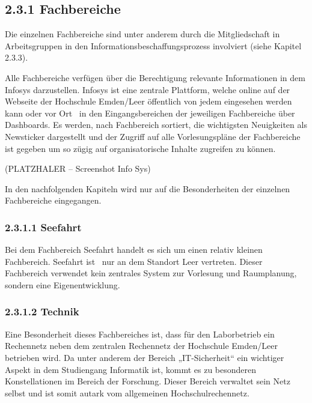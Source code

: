 \documentclass[a4paper]{article}
\begin{document}
\subsection[]{}
\subsection[2.3.1 Fachbereiche]{\bfseries 2.3.1 Fachbereiche}
{\sffamily\mdseries\color{black}
Die einzelnen Fachbereiche sind unter anderem durch die Mitgliedschaft in Arbeitsgruppen in den
Informationsbeschaffungsprozess involviert (siehe Kapitel 2.3.3). }


\bigskip

{\sffamily\mdseries\color{black}
Alle Fachbereiche verfügen über die Berechtigung relevante Informationen in dem Infosys darzustellen. Infosys ist eine
zentrale Plattform, welche online auf der Webseite der Hochschule Emden/Leer öffentlich von jedem eingesehen werden
kann oder vor Ort \ in den Eingangsbereichen der jeweiligen Fachbereiche über Dashboards. Es werden, nach Fachbereich
sortiert, die wichtigsten Neuigkeiten als Newsticker dargestellt und der Zugriff auf alle Vorlesungspläne der
Fachbereiche ist gegeben um so zügig auf organisatorische Inhalte zugreifen zu können. }


\bigskip

{\centering\sffamily\color[rgb]{0.77254903,0.0,0.043137256}
(PLATZHALER – Screenshot Info Sys)
\par}


\bigskip

{\sffamily\mdseries\color{black}
In den nachfolgenden Kapiteln wird nur auf die Besonderheiten der einzelnen Fachbereiche eingegangen.}

\subsubsection{2.3.1.1 Seefahrt}
{\sffamily\mdseries\color{black}
Bei dem Fachbereich Seefahrt handelt es sich um einen relativ kleinen Fachbereich. Seefahrt ist \ nur an dem Standort
Leer vertreten. Dieser Fachbereich verwendet kein zentrales System zur Vorlesung und Raumplanung, sondern eine
Eigenentwicklung.}

\subsubsection{2.3.1.2 Technik}
{\sffamily\mdseries\color{black}
Eine Besonderheit dieses Fachbereiches ist, dass für den Laborbetrieb ein Rechennetz neben dem zentralen Rechennetz der
Hochschule Emden/Leer betrieben wird. Da unter anderem der Bereich „IT-Sicherheit“ ein wichtiger Aspekt in dem
Studiengang Informatik ist, kommt es zu besonderen Konstellationen im Bereich der Forschung. Dieser Bereich verwaltet
sein Netz selbst und ist somit autark vom allgemeinen Hochschulrechennetz. }
\end{document}
